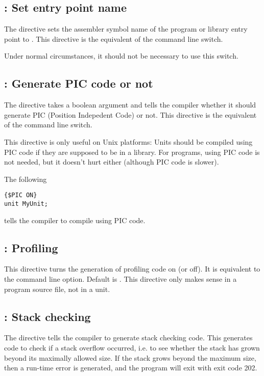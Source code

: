 \subsection{ : Set entry point name}
\label{se:Pascalmainname}
The  directive sets the assembler
symbol name of the program or library entry point to .
This directive is the equivalent of the  command line switch.

Under normal circumstances, it should not be necessary to use this
switch.

\subsection{ : Generate PIC code or not}
\label{se:Pic}
The  directive takes a boolean argument and tells the
compiler whether it should generate PIC (Position Indepedent Code) or not.
This directive is the equivalent of the  command line switch.


This directive is only useful on Unix platforms: Units should be compiled 
using PIC code if they are supposed to be in a library. For programs, using
PIC code is not needed, but it doesn't hurt either (although PIC code is
slower).

The following 
\begin{verbatim}
{$PIC ON}
unit MyUnit;
\end{verbatim}
tells the compiler to compile  using PIC code.

\subsection{ : Profiling}

This directive turns the generation of profiling code on (or off). It is
equivalent to the  command line option. Default is . This
directive only makes sense in a program source file, not in a unit.


\subsection{ : Stack checking}

The  directive tells the compiler to generate stack checking
code. This generates code to check if a stack overflow occurred, i.e. to see
whether the stack has grown beyond its maximally allowed size. If the stack
grows beyond the maximum size, then a run-time error is generated, and the
program will exit with exit code 202.

